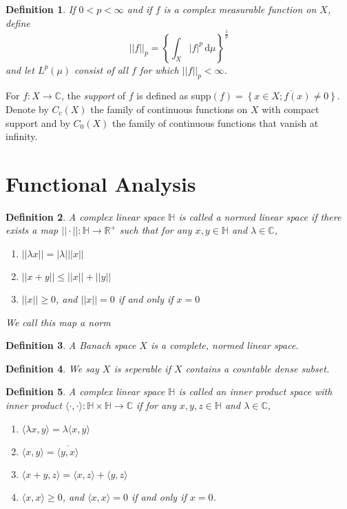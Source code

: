 \documentclass[12pt]{report}
\newtheorem{definition}{Definition}
\numberwithin{definition}{section}
\begin{document}
\begin{definition}
  If $0 < p < \infty$ and if $f$ is a complex measurable function on $X$, define
  \[
    ||f||_{p} = \left\{ \int_{ X} \! |f|^{p} \, \mathrm{d}\mu  \right\}^{\frac{1}{p}}
  \] 
  and let $L^{p}(\mu)$ consist of all $f$ for which $||f||_{p} < \infty$.
\end{definition}

For $ f : X \to \mathbb{C} $, the \textit{support} of $f$ is defined as supp$(f) = \overline{\left\{ x \in X; f(x) \not = 0 \right\}} $.
Denote by $C_{c}(X)$ the family of continuous functions on $X$ with compact support and by $C_{0}(X)$ the family of continuous functions that vanish at infinity.


\break



\section{Functional Analysis}

\begin{definition}
A complex linear space $\mathbb{H}$ is called a \textit{normed linear space} if there exists a map $|| \cdot || : \mathbb{H} \to \mathbb{R}^{+} $ such that for any $x, y \in \mathbb{H}$ and $ \lambda \in \mathbb{C}$,

\begin{enumerate}
  \item $|| \lambda x || = |\lambda| || x ||$
  \item $|| x + y || \leq || x || + || y ||  $
  \item $|| x || \geq 0$, and $|| x || = 0$ if and only if $x = 0$
\end{enumerate}

We call this map a norm
\end{definition}

\begin{definition}
  A Banach space $X$ is a complete, normed linear space.
\end{definition}

\begin{definition}
  We say $X$ is seperable if $X$ contains a countable dense subset.
\end{definition}

\begin{definition}
  A complex linear space $\mathbb{H}$ is called an inner product space with inner product $ \langle \cdot, \cdot \rangle  : \mathbb{H} \times \mathbb{H} \to \mathbb{C} $ if for any $x,y,z \in \mathbb{H}$ and $\lambda \in \mathbb{C}$,
  \begin{enumerate}
    \item $ \langle \lambda x, y \rangle = \lambda \langle x, y \rangle  $
    \item $ \langle x,y \rangle = \overline{ \langle y,x \rangle }$
    \item $ \langle x + y, z \rangle = \langle x,z \rangle + \langle y,z \rangle $
    \item $ \langle x,x \rangle \geq 0$, and $ \langle x,x \rangle = 0 $ if and only if $x = 0$.
  \end{enumerate}
\end{definition}
\end{document}
